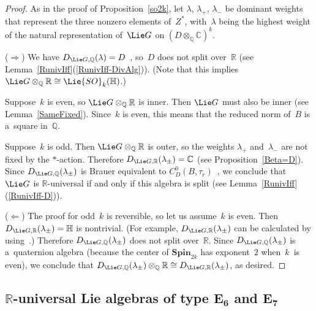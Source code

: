 \documentclass[pdftex]{sigma}
\numberwithin{equation}{section}
\begin{document}
\begin{proof}
As in the proof of Proposition~\ref{so2k}, let $\lambda$, $\lambda_+$, $\lambda_-$ be dominant weights that represent the three nonzero
elements of~$Z^*$, with~$\lambda$ being the highest weight of the natural representation of~$\Lie G$ on
$(D\otimes_\mathbb{Q} \mathbb{C})^k$.

($\Rightarrow$) We have $D_{\Lie G, \mathbb{Q}}(\lambda) = D$~\cite[p.~379]{KnusEtAl-BookOfInvols}, so~$D$ does not
split over~$\mathbb{R}$ (see Lemma~\ref{RunivIff}(\ref{RunivIff-DivAlg})).
(Note that this implies $\Lie G \otimes_\mathbb{Q} \mathbb{R} \cong \Lie{SO}_k(\mathbb{H})$.)

Suppose~$k$ is even, so $\Lie G \otimes_\mathbb{Q} \mathbb{R}$ is inner.
Then $\Lie G$ must also be inner (see Lemma~\ref{SameFixed}).
Since~$k$ is even, this means that the reduced norm of~$B$ is a~square in~$\mathbb{Q}$.

Suppose~$k$ is odd.
Then $\Lie G \otimes_\mathbb{Q} \mathbb{R}$ is outer, so the weights $\lambda_+$ and~$\lambda_-$ are not f\/ixed by the
$*$-action.
Therefore $D_{\Lie G, \mathbb{R}}(\lambda_{\pm}) = \mathbb{C}$ (see Proposition~\ref{Beta=D}).
Since $D_{\Lie G, \mathbb{Q}}(\lambda_{\pm})$ is Brauer equivalent to $C^0_D(B,
\tau_r)$~\cite[p.~379]{KnusEtAl-BookOfInvols}, we conclude that $\Lie G$ is $\mathbb{R}$-universal if and only if this
algebra is split (see Lemma~\ref{RunivIff}(\ref{RunivIff-D})).

($\Leftarrow$) The proof for odd~$k$ is reversible, so let us assume~$k$ is even.
Then $D_{\Lie G, \mathbb{R}}(\lambda_{\pm}) = \mathbb{H}$ is nontrivial.
(For example, $D_{\Lie G, \mathbb{R}}(\lambda_{\pm})$ can be calculated by using~\cite[\S~5.5]{Tits-RepLinIrred}.)
Therefore $D_{\Lie G, \mathbb{Q}}(\lambda_{\pm})$ does not split over~$\mathbb{R}$.
Since $D_{\Lie G, \mathbb{Q}}(\lambda_{\pm})$ is a~quaternion algebra (because the center of $\mathbf{Spin}_{2k}$ has
exponent~$2$ when~$k$~is even), we conclude that $D_{\Lie G, \mathbb{Q}}(\lambda_{\pm}) \otimes_\mathbb{Q} \mathbb{R}
\cong D_{\Lie G, \mathbb{R}}(\lambda_{\pm})$, as desired.
\end{proof}

\subsection[$\mathbb{R}$-universal Lie algebras of type $E_6$ and $E_7$]{$\boldsymbol{\mathbb{R}}$-universal Lie algebras of type $\boldsymbol{E_6}$ and $\boldsymbol{E_7}$}\label{TypeE}
\end{document}
